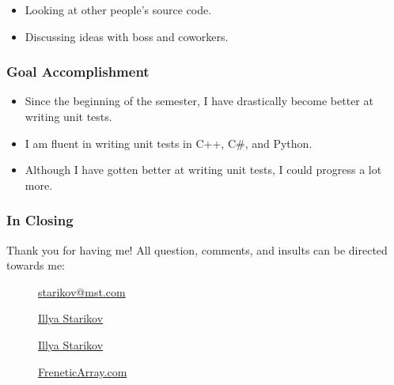 \documentclass[xclolor=dvipsnames]{beamer}            %
\begin{document}
\begin{darkframes}
\begin{frame}
\begin{itemize}
            \item Looking at other people's source code.
            \item Discussing ideas with boss and coworkers.
        \end{itemize}
    \end{frame}

    \begin{frame}
        \frametitle{Goal Accomplishment}

        \begin{itemize}
            \item Since the beginning of the semester, I have drastically become better at writing unit tests.
            \item I am fluent in writing unit tests in C++, C\#, and Python.
            \item Although I have gotten better at writing unit tests, I could progress a lot more.
        \end{itemize}
    \end{frame}

    \begin{frame}
        \frametitle{In Closing}

        Thank you for having me! All question, comments, and insults can be directed towards me:

        \begin{center}
            \begin{description}
                \item[\faComment] \href{mailto:starikov@mst.edu}{starikov@mst.com}
                \item[\faLinkedin] \href{https://www.linkedin.com/in/illyastarikov/}{Illya Starikov}
                \item[\faGithub] \href{https://github.com/IllyaStarikov/}{Illya Starikov}
                \item[\faRss] \href{https://freneticarray.com/}{FreneticArray.com}
            \end{description}
        \end{center}
    \end{frame}
\end{darkframes}
\end{document}
